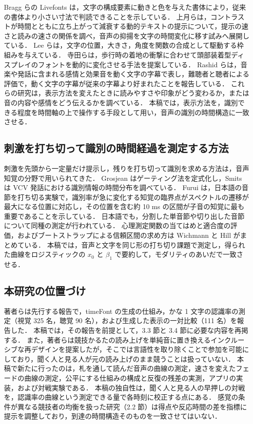 Bragg らの Livefonts は，文字の構成要素に動きと色を与えた書体により，従来の書体より小さい寸法で判読できることを示している\cite{bragg2017}．
上月らは，コントラストが時間とともに立ち上がって減衰する動的テキストの提示について，提示の速さと読みの速さの関係を調べ\cite{uetsuki2017}，音声の抑揚を文字の時間変化に移す試みへ展開している\cite{uetsuki2020}．
Lee らは，文字の位置，大きさ，角度を関数の合成として駆動する枠組みを与えている\cite{lee2002}．
寺田らは，歩行時の着地の衝撃に合わせて頭部装着型ディスプレイのフォントを動的に変化させる手法を提案している\cite{matsuura2025}．
Rashid らは，音楽や発話に含まれる感情と効果音を動く文字の字幕で表し，難聴者と聴者による評価で，動く文字の字幕が従来の字幕より好まれたことを報告している\cite{rashid2008}．
これらの研究は，表示方法を変えたときに読みやすさや印象がどう変わるか，または音の内容や感情をどう伝えるかを調べている．
本稿では，表示方法を，識別できる程度を時間軸の上で操作する手段として用い，音声の識別の時間構造に一致させる．

\subsection{刺激を打ち切って識別の時間経過を測定する方法}

刺激を先頭から一定量だけ提示し，残りを打ち切って識別を求める方法は，音声知覚の分野で用いられてきた．
Grosjean はゲーティング法を定式化し\cite{grosjean1980}，Smits は VCV 発話における識別情報の時間分布を調べている\cite{smits2000}．
Furui は，日本語の音節を打ち切る実験で，識別率が急に変化する知覚の臨界点がスペクトルの遷移が最大になる位置に対応し，その位置を含む約 10 ms の区間が子音の知覚に最も重要であることを示している\cite{furui1986}．
日本語でも，分割した単音節や切り出した音節について同種の測定が行われている\cite{takeuchi1961,kuwabara1972}．
心理測定関数の当てはめと適合度の評価，およびブートストラップによる信頼区間の求め方は Wichmann と Hill がまとめている\cite{wichmann2001,wichmann2001b}．
本稿では，音声と文字を同じ形の打ち切り課題で測定し，得られた曲線をロジスティックの $x_0$ と $\beta_1$ で要約して，モダリティのあいだで一致させる．

\subsection{本研究の位置づけ}

著者らは先行する報告\cite{maruyama2026wiss}で，timeFont の生成の仕組み，かな 1 文字の認識率の測定（視覚 325 名，聴覚 90 名），および生成した表示の一対比較（111 名）を報告した．
本稿では，その報告を前提として，3.3 節と 3.4 節に必要な内容を再掲する．
また，著者らは競技かるたの読み上げを単純音に置き換えるインクルーシブな再デザインを提案したが\cite{maruyama2025ec}，そこでは言語性を取り除くことで参加を可能にしており，聞く人と見る人が元の読み上げのまま競うことは扱っていない．
本稿で新たに行ったのは，札を通して読んだ音声の曲線の測定，速さを変えたフェードの曲線の測定，公平にする仕組みの構成と反復の残差の実測，アプリの実装，および対戦実験である．
本稿の独自性は，聞く人と見る人の早押しの対戦を，認識率の曲線という測定できる量で各時刻に校正する点にある．
感覚の条件が異なる競技者の均衡を扱った研究（2.2 節）は得点や反応時間の差を指標に提示を調整しており，到達の時間構造そのものを一致させてはいない．

